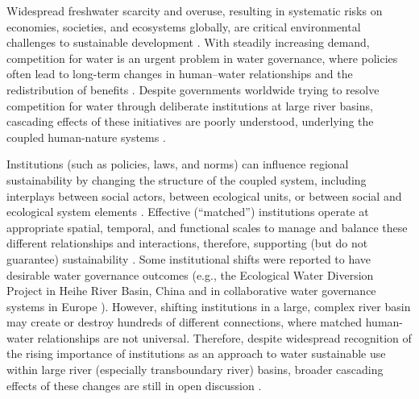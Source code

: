Widespread freshwater scarcity and overuse, resulting in systematic risks on economies, societies, and ecosystems globally, are critical environmental challenges to sustainable development \cite{distefano2017, dolan2021, xu2020b, mekonnen2016}.
With steadily increasing demand, competition for water is an urgent problem in water governance, where policies often lead to long-term changes in human–water relationships and the redistribution of benefits \cite{gleick2010, ziolkowska2016, wang2019d}.
Despite governments worldwide trying to resolve competition for water through deliberate institutions at large river basins, cascading effects of these initiatives are poorly understood, underlying the coupled human-nature systems \cite{giuliani2013, falkenmark2019, jaeger2019}.

Institutions (such as policies, laws, and norms) can influence regional sustainability by changing the structure of the coupled system, including interplays between social actors, between ecological units, or between social and ecological system elements \cite{young2008,cumming2020b,lien2020, bodin2017b}.
Effective (“matched”) institutions operate at appropriate spatial, temporal, and functional scales to manage and balance these different relationships and interactions, therefore, supporting (but do not guarantee) sustainability \cite{epstein2015, wang2019d}.
Some institutional shifts were reported to have desirable water governance outcomes (e.g., the Ecological Water Diversion Project in Heihe River Basin, China \cite{wang2019d} and in collaborative water governance systems in Europe \cite{green2013}).
However, shifting institutions in a large, complex river basin may create or destroy hundreds of different connections, where matched human-water relationships are not universal.
Therefore, despite widespread recognition of the rising importance of institutions as an approach to water sustainable use within large river (especially transboundary river) basins, broader cascading effects of these changes are still in open discussion \cite{agrawal2003, persha2011, agrawal2001}.

